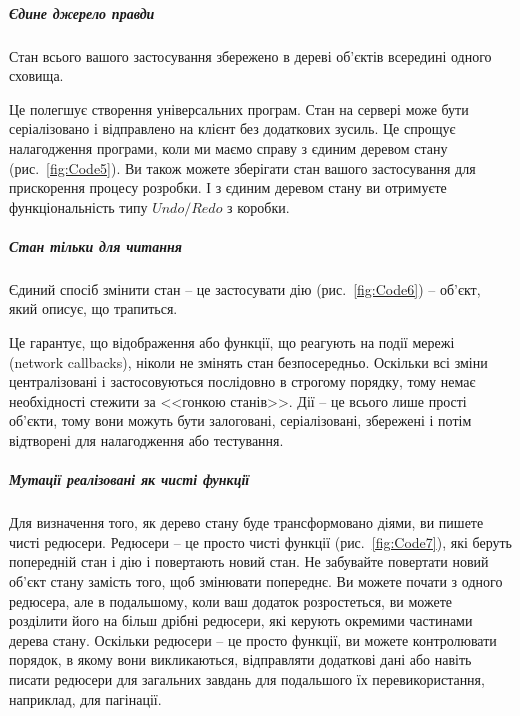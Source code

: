\subparagraph{Єдине джерело правди}

Стан всього вашого застосування збережено в дереві об'єктів всередині одного сховища.

Це полегшує створення універсальних програм. Стан на сервері може бути серіалізовано і відправлено на клієнт без додаткових зусиль. Це спрощує налагодження програми, коли ми маємо справу з єдиним деревом стану (рис.~\ref{fig:Code5}). Ви також можете зберігати стан вашого застосування для прискорення процесу розробки. І з єдиним деревом стану ви отримуєте функціональність типу $Undo / Redo$ з коробки.


\subparagraph{Стан тільки для читання}


Єдиний спосіб змінити стан -- це застосувати дію (рис.~\ref{fig:Code6}) -- об'єкт, який описує, що трапиться. 

Це гарантує, що відображення або функції, що реагують на події мережі (network callbacks), ніколи не змінять стан безпосередньо. Оскільки всі зміни централізовані і застосовуються послідовно в строгому порядку, тому немає необхідності стежити за <<гонкою станів>>. Дії -- це всього лише прості об'єкти, тому вони можуть бути залоговані, серіалізовані, збережені і потім відтворені для налагодження або тестування.

\subparagraph{Мутації реалізовані як чисті функції}


Для визначення того, як дерево стану буде трансформовано діями, ви пишете чисті редюсери.
Редюсери -- це просто чисті функції (рис.~\ref{fig:Code7}), які беруть попередній стан і дію і повертають новий стан. Не забувайте повертати новий об'єкт стану замість того, щоб змінювати попереднє. Ви можете почати з одного редюсера, але в подальшому, коли ваш додаток розростеться, ви можете розділити його на більш дрібні редюсери, які керують окремими частинами дерева стану. Оскільки редюсери -- це просто функції, ви можете контролювати порядок, в якому вони викликаються, відправляти додаткові дані або навіть писати редюсери для загальних завдань для подальшого їх перевикористання, наприклад, для пагінації.


